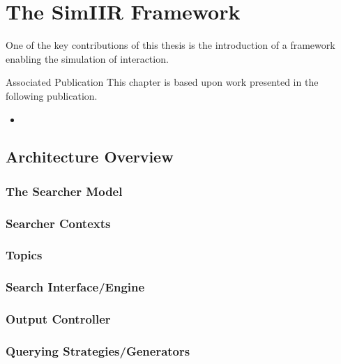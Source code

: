 
\chapter{The SimIIR Framework}\label{appx:simiir}
One of the key contributions of this thesis is the introduction of a framework enabling the simulation of interaction. 

\begin{publications_box}{Associated Publication}
This chapter is based upon work presented in the following publication.
\vspace*{-3mm}
\begin{itemize}
    \item{}
\end{itemize}
\end{publications_box}


\section{Architecture Overview}

\subsection{The Searcher Model}

\subsection{Searcher Contexts}

\subsection{Topics}

\subsection{Search Interface/Engine}

\subsection{Output Controller}

\subsection{Querying Strategies/Generators}

